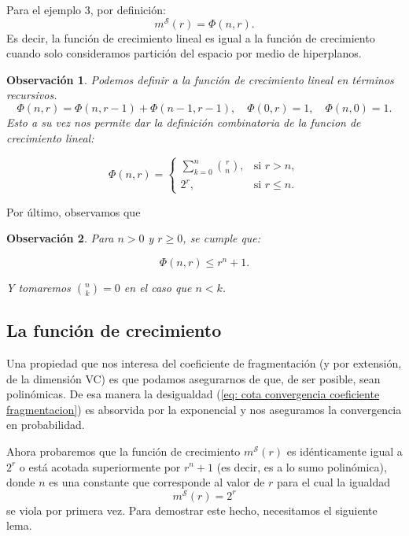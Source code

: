 \documentclass{report}
\newtheorem{obs}{Observación}[subsection]
\begin{document}
Para el ejemplo 3, por definición:
\[
    m^{\mathcal{S}}(r) = \Phi(n, r).
\]
Es decir, la función de crecimiento lineal es igual a la función de crecimiento cuando solo consideramos partición
del espacio por medio de hiperplanos.

\begin{obs}
Podemos definir a la función de crecimiento lineal en términos recursivos. 
\[
    \Phi(n, r) = \Phi(n, r - 1) + \Phi(n - 1, r - 1),\quad \Phi(0, r) = 1, \quad \Phi(n, 0) = 1.
\]
Esto a su vez nos permite dar la definición combinatoria de la funcion de crecimiento lineal:

\begin{equation}
\Phi(n, r) =
\begin{cases}
\sum\limits_{k=0}^{n} \binom{r}{n}, & \text{si } r > n, \\
2^r, & \text{si } r \leq n.
\end{cases}
\label{def: combinatoria función crecimiento lineal}
\end{equation}
\end{obs}

Por último, observamos que

\begin{obs}   
Para \( n > 0 \) y \( r \geq 0 \), se cumple que:

\[
\Phi(n, r) \leq r^n + 1.
\]

Y tomaremos \( \binom{n}{k} = 0 \) en el caso que \( n < k \).\newline
\end{obs}

\subsection{La función de crecimiento}

Una propiedad que nos interesa del coeficiente de fragmentación (y por extensión, de la dimensión VC) es que podamos asegurarnos
de que, de ser posible, sean polinómicas. De esa manera la desigualdad (\ref{eq: cota convergencia coeficiente fragmentacion})
es absorvida por la exponencial y nos aseguramos la convergencia en probabilidad. \newline

Ahora probaremos que la función de crecimiento $m^{\mathcal{S}}(r)$ 
es idénticamente igual a \( 2^r \) o está acotada superiormente por \( r^n + 1 \) (es decir, es a lo sumo polinómica),  
donde \( n \) es una constante que corresponde al valor de \( r \) para el cual la igualdad  
\[
m^{\mathcal{S}}(r) = 2^r
\]
se viola por primera vez. Para demostrar este hecho, necesitamos el siguiente lema.\newline
\end{document}
